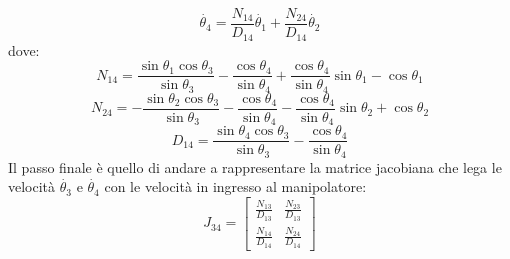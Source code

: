\begin{equation}
	\dot{\theta_4} = \frac{N_{14}}{D_{14}}\dot{\theta_1}+\frac{N_{24}}{D_{14}}\dot{\theta_2}
\end{equation} 
dove:
\begin{equation*}
    N_{14} = \frac{\sin\theta_1\cos\theta_3}{\sin\theta_3}-\frac{\cos\theta_4}{\sin\theta_4}+\frac{\cos\theta_4}{\sin\theta_4}\sin\theta_1 - \cos\theta_1
\end{equation*}
\begin{equation*}
    N_{24} = -\frac{\sin\theta_2\cos\theta_3}{\sin\theta_3}-\frac{\cos\theta_4}{\sin\theta_4}-\frac{\cos\theta_4}{\sin\theta_4}\sin\theta_2+\cos\theta_2
\end{equation*}
\begin{equation*}
    D_{14} = \frac{\sin\theta_4\cos\theta_3}{\sin\theta_3}-\frac{\cos\theta_4}{\sin\theta_4}
\end{equation*}
Il passo finale è quello di andare a rappresentare la matrice jacobiana che lega le velocità $\dot{\theta_3}$ e $\dot{\theta_4}$ con le velocità in ingresso al manipolatore:
\begin{equation}
    J_{34} = \begin{bmatrix}
    \frac{N_{13}}{D_{13}} & \frac{N_{23}}{D_{13}} \\
    \frac{N_{14}}{D_{14}} & \frac{N_{24}}{D_{14}}
    \end{bmatrix}
\end{equation}
